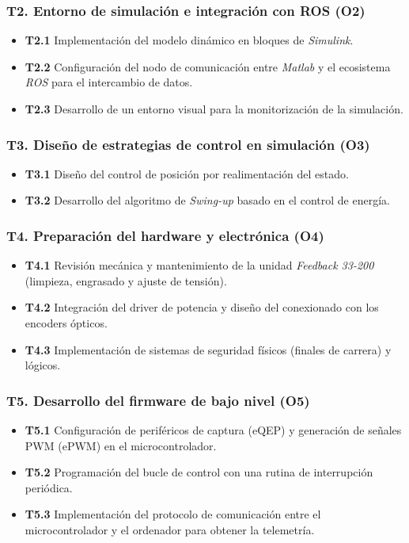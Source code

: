 \documentclass[11pt,fleqn]{book} %
\begin{document}
\subsubsection{T2. Entorno de simulación e integración con ROS (O2)}
\begin{itemize}
	\item \textbf{T2.1} Implementación del modelo dinámico en bloques de \textit{Simulink}.
	\item \textbf{T2.2} Configuración del nodo de comunicación entre \textit{Matlab} y el ecosistema \textit{ROS} para el intercambio de datos.
	\item \textbf{T2.3} Desarrollo de un entorno visual para la monitorización de la simulación.
\end{itemize}

\subsubsection{T3. Diseño de estrategias de control en simulación (O3)}
\begin{itemize}
	\item \textbf{T3.1} Diseño del control de posición por realimentación del estado.
	\item \textbf{T3.2} Desarrollo del algoritmo de \textit{Swing-up} basado en el control de energía.
\end{itemize}

\subsubsection{T4. Preparación del hardware y electrónica (O4)}
\begin{itemize}
	\item \textbf{T4.1} Revisión mecánica y mantenimiento de la unidad \textit{Feedback 33-200} (limpieza, engrasado y ajuste de tensión).
	\item \textbf{T4.2} Integración del driver de potencia y diseño del conexionado con los encoders ópticos.
	\item \textbf{T4.3} Implementación de sistemas de seguridad físicos (finales de carrera) y lógicos.
\end{itemize}

\subsubsection{T5. Desarrollo del firmware de bajo nivel (O5)}
\begin{itemize}
	\item \textbf{T5.1} Configuración de periféricos de captura (eQEP) y generación de señales PWM (ePWM) en el microcontrolador.
	\item \textbf{T5.2} Programación del bucle de control con una rutina de interrupción periódica.
	\item \textbf{T5.3} Implementación del protocolo de comunicación entre el microcontrolador y el ordenador para obtener la telemetría.
\end{itemize}
\end{document}
